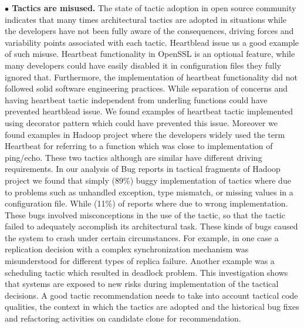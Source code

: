 \documentclass[conference]{IEEEtran}
\begin{document}
\noindent \textbf{$\bullet$ Tactics are misused.} The state of tactic adoption in open source community indicates that many times architectural tactics are adopted in situations while the developers have not been fully aware of the consequences, driving forces and variability points \cite{FSE2012} associated with each tactic.
Heartblead issue us a good example of such misuse. Heartbeat functionality in OpenSSL is an optional feature, while many developers could have easily disabled it in configuration files they fully ignored that. Furthermore, the implementation of heartbeat functionality did not followed solid software engineering practices. While separation of concerns and having heartbeat tactic independent from underling functions could have prevented heartblead issue. We found examples of heartbeat tactic implemented using decorator pattern which could have prevented this issue.
Moreover we found examples in Hadoop project where the developers widely used the term Heartbeat for referring to a function which was close to implementation of ping/echo. These two tactics although are similar have different driving requirements.
In our analysis of Bug reports in tactical fragments of Hadoop project we found that simply  (89\%) buggy implementation of tactics where due to problems such as  unhandled exception, type mismatch, or missing values in a configuration file. While  (11\%) of reports where due to wrong implementation. These bugs involved misconceptions in the use of the tactic, so that the tactic failed to adequately accomplish its architectural task.  These kinds of bugs caused the system to crash under certain circumstances.  For example, in one case a replication decision with a complex synchronization mechanism was misunderstood for different types of replica failure.
Another example was a scheduling tactic which resulted in deadlock problem. This investigation shows that systems are exposed to new risks during implementation of the tactical decisions. A good tactic recommendation needs to take into account tactical code qualities, the context in which the tactics are adopted and the historical bug fixes and refactoring activities on candidate clone for recommendation.
\end{document}
